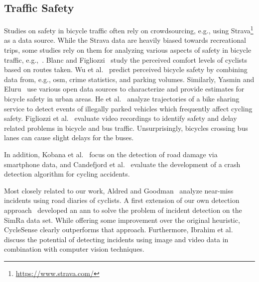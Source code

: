 \subsection{Traffic Safety\label{subsec:trafficsafety}}
Studies on safety in bicycle traffic often rely on crowdsourcing, e.g., using Strava\footnote{\url{https://www.strava.com/}} as a data source.
While the Strava data are heavily biased towards recreational trips, some studies rely on them for analyzing various aspects of safety in bicycle traffic, e.g.,~\cite{hochmair2019estimating,ferster2021strava}.
Blanc and Figliozzi~\cite{blanc2016modeling, blanc2017safety} study the perceived comfort levels of cyclists based on routes taken.
Wu et al.~\cite{wu2018predicting} predict perceived bicycle safety by combining data from, e.g., \ac{osm}, crime statistics, and parking volumes.
Similarly, Yasmin and Eluru~\cite{yasmin2016latent} use various open data sources to characterize and provide estimates for bicycle safety in urban areas.
He et al.~\cite{he2018detecting} analyze trajectories of a bike sharing service to detect events of illegally parked vehicles which frequently affect cycling safety.
Figliozzi et al.~\cite{figliozzi2019evaluation} evaluate video recordings to identify safety and delay related problems in bicycle and bus traffic.
Unsurprisingly, bicycles crossing bus lanes can cause slight delays for the buses.

In addition, Kobana et al.~\cite{kobana2014detection} focus on the detection of road damage via smartphone data, and Candefjord et al.~\cite{candefjord2014using} evaluate the development of a crash detection algorithm for cycling accidents.

Most closely related to our work, Aldred and Goodman~\cite{aldred2018predictors} analyze near-miss incidents using road diaries of cyclists.
A first extension of our own detection approach~\cite{sanchez2020detecting} developed an \ac{ann} to solve the problem of incident detection on the SimRa data set.
While offering some improvement over the original heuristic, CycleSense clearly outperforms that approach.
Furthermore, Ibrahim et al.~\cite{ibrahim2021cycling} discuss the potential of detecting incidents using image and video data in combination with computer vision techniques.

